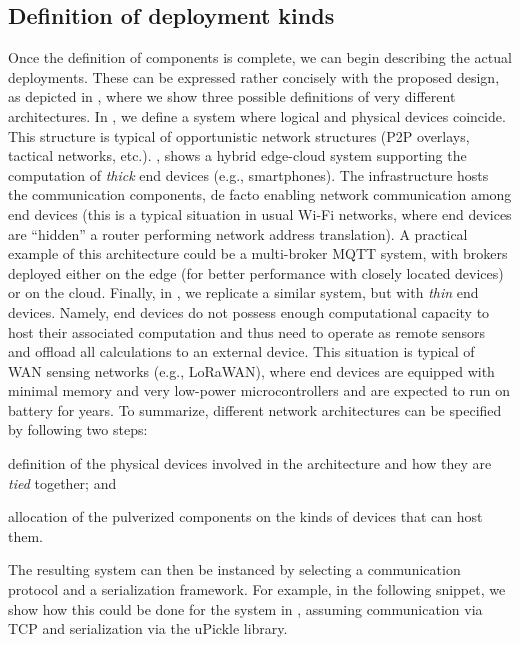 \subsection{Definition of deployment kinds}


Once the definition of components is complete, we can begin describing the actual deployments.
%
These can be expressed rather concisely with the proposed design, 
 as depicted in , where we show three possible definitions of very different architectures.
%
In , we define a system where logical and physical devices coincide.
%
This structure is typical of opportunistic network structures (P2P overlays, tactical networks, etc.).
%
, shows a hybrid edge-cloud system supporting the computation of \emph{thick} end devices (e.g., smartphones).
%
The infrastructure hosts the communication components,
 de facto enabling network communication among end devices
 (this is a typical situation in usual Wi-Fi networks, where end devices are ``hidden'' a router performing network address translation).
%
A practical example of this architecture could be a multi-broker MQTT system,
 with brokers deployed either on the edge
 (for better performance with closely located devices)
 or on the cloud.
%
Finally, in , we replicate a similar system, but with \emph{thin} end devices.
%
Namely, end devices do not possess enough computational capacity to host their associated computation
and thus need to operate as remote sensors and offload all calculations to an external device.
%
This situation is typical of WAN sensing networks (e.g., LoRaWAN),
 where end devices are equipped with minimal memory and very low-power microcontrollers
 and are expected to run on battery for years.
%
To summarize, different network architectures can be specified by following two steps:
\begin{enumerate*}
 \item definition of the physical devices involved in the architecture and how they are \emph{tied} together; and
 \item allocation of the pulverized components on the kinds of devices that can host them.
\end{enumerate*}

The resulting system can then be instanced by selecting a communication protocol and a serialization framework.
%
For example, in the following snippet, 
 we show how this could be done for the system in , 
 assuming communication via TCP and serialization via the uPickle library.

